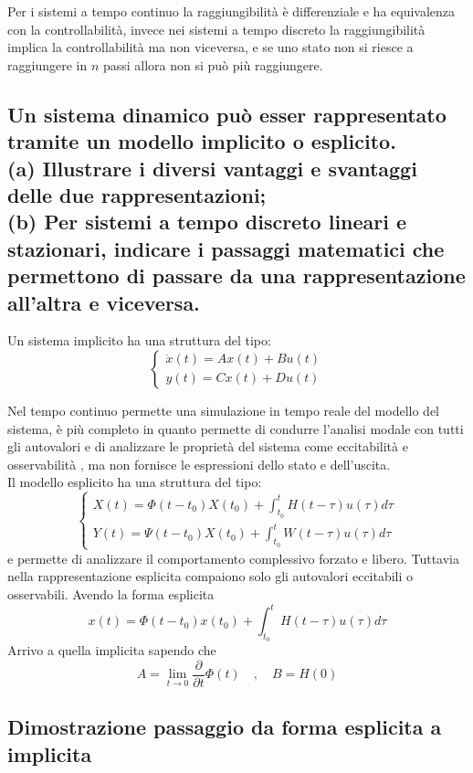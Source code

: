 \documentclass{article}
\begin{document}
Per i sistemi a tempo continuo la raggiungibilità è differenziale e ha equivalenza con la controllabilità,
invece nei sistemi a tempo discreto la raggiungibilità implica la controllabilità ma non viceversa,
e se uno stato non si riesce a raggiungere in $n$ passi allora non si può più raggiungere.


\subsection{Un sistema dinamico può esser rappresentato tramite un modello implicito o esplicito. \\
(a) Illustrare i diversi vantaggi e svantaggi delle due rappresentazioni; \\
(b) Per sistemi a tempo discreto lineari e stazionari, indicare i passaggi matematici che permettono di passare da una rappresentazione all'altra e viceversa.
}
Un sistema implicito ha una struttura del tipo:
$$
\begin{cases}
    \dot{x}(t) = Ax(t)+Bu(t)\\
    y(t) = Cx(t)+Du(t)
\end{cases}
$$

Nel tempo continuo permette una simulazione in tempo reale del modello del sistema, è più completo in quanto permette di condurre l'analisi modale con tutti gli autovalori e di analizzare le proprietà del sistema come eccitabilità e osservabilità , ma non fornisce le espressioni dello stato e dell'uscita.\\
Il modello esplicito ha una struttura del tipo:
\[
\begin{cases}
    X(t) = \Phi(t-t_0)X(t_0)+\int_{t_0}^{t}H(t-\tau)u(\tau)d\tau\\
    Y(t) = \Psi(t-t_0)X(t_0)+\int_{t_0}^{t}W(t-\tau)u(\tau)d\tau
\end{cases}
\]
e permette di analizzare il comportamento complessivo forzato e libero.
Tuttavia nella rappresentazione esplicita compaiono solo gli autovalori eccitabili o osservabili.
Avendo la forma esplicita 
\[     x(t) = \Phi(t-t_0)x(t_0)+\int_{t_0}^{t} H(t-\tau)u(\tau)d\tau \]
Arrivo a quella implicita sapendo che 
\[ A = \lim_{t\to 0}\frac{\partial }{\partial t}\Phi(t) \quad,\quad B = H(0) \]




\subsection{Dimostrazione passaggio da forma esplicita a implicita}
\end{document}
